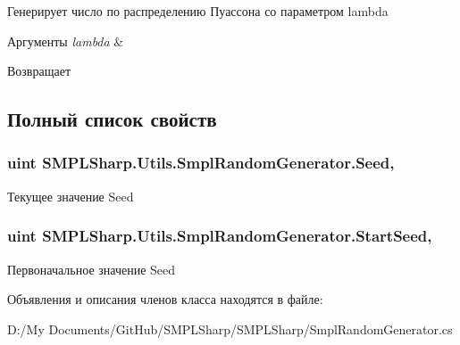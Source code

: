 Генерирует число по распределению Пуассона со параметром lambda 


\begin{DoxyParams}{Аргументы}
{\em lambda} & \\
\hline
\end{DoxyParams}
\begin{DoxyReturn}{Возвращает}

\end{DoxyReturn}


\subsection{Полный список свойств}
\hypertarget{class_s_m_p_l_sharp_1_1_utils_1_1_smpl_random_generator_a504f2e98704d7f18cfacc0d36be02eaf}{
\subsubsection[{Seed}]{\setlength{\rightskip}{0pt plus 5cm}uint S\-M\-P\-L\-Sharp.\-Utils.\-Smpl\-Random\-Generator.\-Seed\hspace{0.3cm}{\ttfamily [get]}, {\ttfamily [set]}}}\label{d0/d33/class_s_m_p_l_sharp_1_1_utils_1_1_smpl_random_generator_a504f2e98704d7f18cfacc0d36be02eaf}


Текущее значение Seed 

\hypertarget{class_s_m_p_l_sharp_1_1_utils_1_1_smpl_random_generator_a87ae75f71d8390f0980feef6e82b7d87}{
\subsubsection[{Start\-Seed}]{\setlength{\rightskip}{0pt plus 5cm}uint S\-M\-P\-L\-Sharp.\-Utils.\-Smpl\-Random\-Generator.\-Start\-Seed\hspace{0.3cm}{\ttfamily [get]}, {\ttfamily [set]}}}\label{d0/d33/class_s_m_p_l_sharp_1_1_utils_1_1_smpl_random_generator_a87ae75f71d8390f0980feef6e82b7d87}


Первоначальное значение Seed 



Объявления и описания членов класса находятся в файле\-:\begin{DoxyCompactItemize}
\item 
D\-:/\-My Documents/\-Git\-Hub/\-S\-M\-P\-L\-Sharp/\-S\-M\-P\-L\-Sharp/Smpl\-Random\-Generator.\-cs\end{DoxyCompactItemize}
